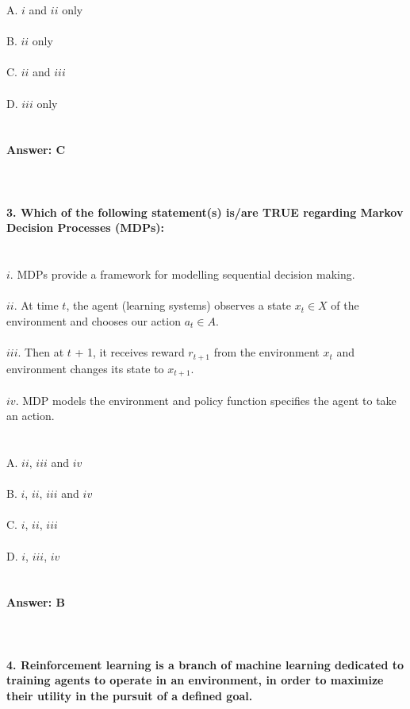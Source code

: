 \documentclass[prl,twocolumn,showpacs,preprintnumbers,superscriptaddress]{revtex4}
\theoremstyle{plain}
\theoremstyle{definition}
\begin{document}
\begin{widetext}
A. $i$ and $ii$ only
\\
\\
B. $ii$ only
\\
\\
C. $ii$ and $iii$
\\
\\
D. $iii$ only
\\
\\
\\
\textbf{Answer: C}
\\
\\
\\
\\
\textbf{3. Which of the following statement(s) is/are TRUE regarding Markov Decision Processes (MDPs):}
\\
\\
\\
$i$. MDPs provide a framework for modelling sequential decision making.
\\
\\
$ii$. At time $t$, the agent (learning systems) observes a state $x_{t} \in X$ of the environment and chooses our action $a_{t} \in A$.
\\
\\
$iii$. Then at $t$ + 1, it receives reward $r_{t+1}$ from the environment $x_{t}$ and environment changes its state to $x_{t+1}$.
\\
\\
$iv$. MDP models the environment and policy function specifies the agent to take an action.
\\
\\
\\
A. $ii$, $iii$ and $iv$
\\
\\
B. $i$, $ii$, $iii$ and $iv$
\\
\\
C. $i$, $ii$, $iii$
\\
\\
D. $i$, $iii$, $iv$
\\
\\
\\
\textbf{Answer: B}
\\
\\
\\
\\
\textbf{4. Reinforcement learning is a branch of machine learning dedicated to training agents to operate in an environment, in order to maximize their utility in the pursuit of a defined goal.}
\\

\end{widetext}
\end{document}
